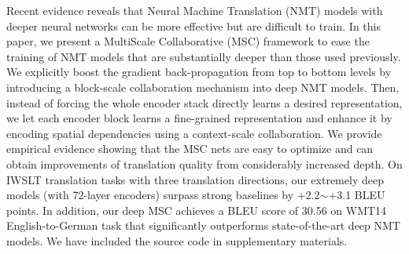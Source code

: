 Recent evidence reveals that Neural Machine Translation (NMT) models with deeper neural networks can be more effective but are difficult to train. In this paper, we present a MultiScale Collaborative (MSC) framework to ease the training of NMT models that are substantially deeper than those used previously. We explicitly boost the gradient back-propagation from top to bottom levels by introducing a block-scale collaboration mechanism into deep NMT models. Then, instead of forcing the whole encoder stack directly learns a desired representation, we let each encoder block learns a fine-grained representation and enhance it by encoding spatial dependencies using a context-scale collaboration. We provide empirical evidence showing that the MSC nets are easy to optimize and can obtain improvements of translation quality from considerably increased depth. On IWSLT translation tasks with three translation directions, our extremely deep models (with 72-layer encoders) surpass strong baselines by +2.2$\sim$+3.1 BLEU points. In addition, our deep MSC achieves a BLEU score of 30.56 on WMT14 English-to-German task that significantly outperforms state-of-the-art deep NMT models. We have included the source code in supplementary materials.
